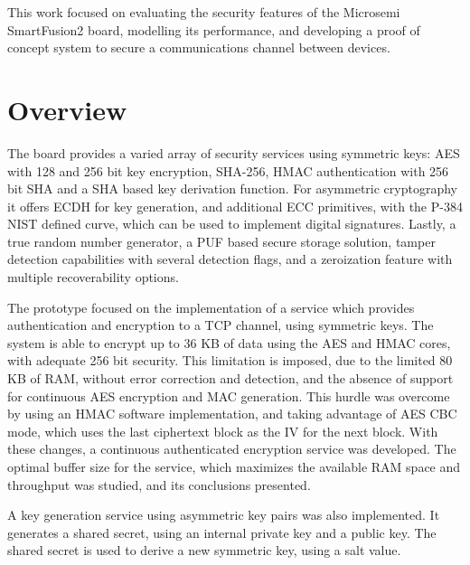 \cleardoublepage
\label{chap:conclusion}

This work focused on evaluating the security features of the Microsemi SmartFusion2 board, modelling its performance, and developing a proof of concept system to secure a communications channel between devices.

\section{Overview} \label{chap:conclusion:overview}

The board provides a varied array of security services using symmetric keys: AES with 128 and 256 bit key encryption, SHA-256, HMAC authentication with 256 bit SHA and a SHA based key derivation function. For asymmetric cryptography it offers ECDH for key generation, and additional ECC primitives, with the P-384 NIST defined curve, which can be used to implement digital signatures. Lastly, a true random number generator, a PUF based secure storage solution, tamper detection capabilities with several detection flags, and a zeroization feature with multiple recoverability options.

The prototype focused on the implementation of a service which provides authentication and encryption to a TCP channel, using symmetric keys. The system is able to encrypt up to 36 KB of data using the AES and HMAC cores, with adequate 256 bit security. This limitation is imposed, due to the limited 80 KB of RAM, without error correction and detection, and the absence of support for continuous AES encryption and MAC generation. This hurdle was overcome by using an HMAC software implementation, and taking advantage of AES CBC mode, which uses the last ciphertext block as the IV for the next block. With these changes, a continuous authenticated encryption service was developed. The optimal buffer size for the service, which maximizes the available RAM space and throughput was studied, and its conclusions presented.

A key generation service using asymmetric key pairs was also implemented. It generates a shared secret, using an internal private key and a public key. The shared secret is used to derive a new symmetric key, using a salt value.

